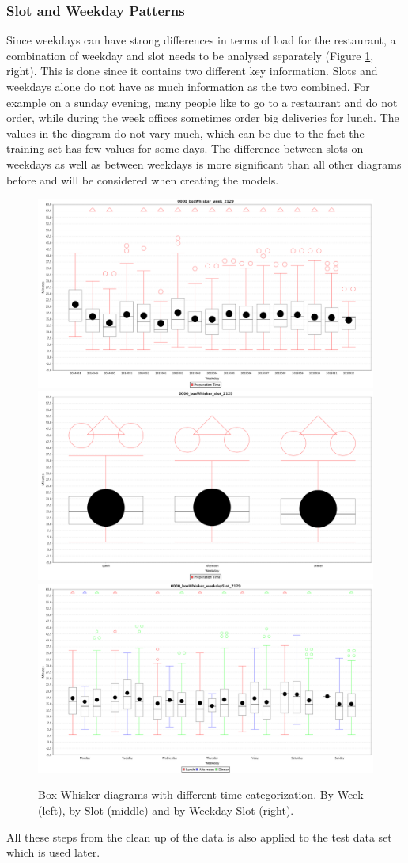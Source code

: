 \subsubsection{Slot and Weekday Patterns}
Since weekdays can have strong differences in terms of load for the restaurant, a combination of weekday and slot needs to be analysed separately (Figure \ref{fig:triple_boxWhisker}, right).
This is done since it contains two different key information. Slots and weekdays alone do not have as much information as the two combined. For example on a sunday evening, many people like to go to a restaurant and do not order, while during the week offices sometimes order big deliveries for lunch. The values in the diagram do not vary much, which can be due to the fact the training set has few values for some days.\newline
The difference between slots on weekdays as well as between weekdays is more significant than all other diagrams before and will be considered when creating the models.

\begin{figure}[htp]

\centering
\includegraphics[width=.3\textwidth]{images/0000_boxWhisker_week_2129.png}\hfill
\includegraphics[width=.3\textwidth]{images/0000_boxWhisker_slot_2129.png}\hfill
\includegraphics[width=.3\textwidth]{images/0000_boxWhisker_weekdaySlot_2129.png}

\caption{Box Whisker diagrams with different time categorization. By Week (left), by Slot (middle) and by Weekday-Slot (right).}
\label{fig:triple_boxWhisker}

\end{figure}

All these steps from the clean up of the data is also applied to the test data set which is used later.

